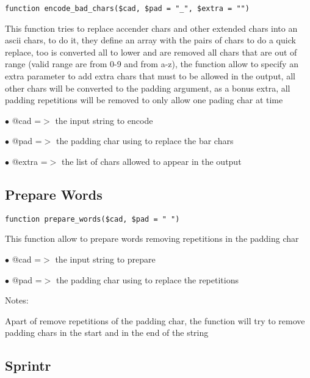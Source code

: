 \documentclass[a4paper]{book}
\begin{document}
\begin{lstlisting}
function encode_bad_chars($cad, $pad = "_", $extra = "")
\end{lstlisting}

This function tries to replace accender chars and other extended chars into
an ascii chars, to do it, they define an array with the pairs of chars to
do a quick replace, too is converted all to lower and are removed all chars
that are out of range (valid range are from 0-9 and from a-z), the function
allow to specify an extra parameter to add extra chars that must to be
allowed in the output, all other chars will be converted to the padding
argument, as a bonus extra, all padding repetitions will be removed to
only allow one pading char at time

\begin{compactitem}
\item[\color{myblue}$\bullet$] @cad   =$>$ the input string to encode
\item[\color{myblue}$\bullet$] @pad   =$>$ the padding char using to replace the bar chars
\item[\color{myblue}$\bullet$] @extra =$>$ the list of chars allowed to appear in the output
\end{compactitem}

\hypertarget{toc253}{}
\subsection{Prepare Words}

\begin{lstlisting}
function prepare_words($cad, $pad = " ")
\end{lstlisting}

This function allow to prepare words removing repetitions in the padding char

\begin{compactitem}
\item[\color{myblue}$\bullet$] @cad =$>$ the input string to prepare
\item[\color{myblue}$\bullet$] @pad =$>$ the padding char using to replace the repetitions
\end{compactitem}

Notes:

Apart of remove repetitions of the padding char, the function will try to
remove padding chars in the start and in the end of the string

\hypertarget{toc254}{}
\subsection{Sprintr}
\end{document}
